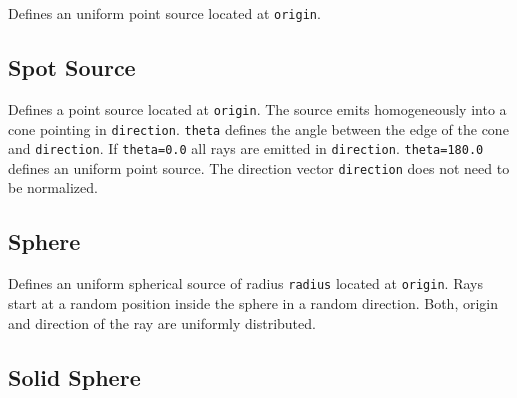 \documentclass[10pt,a4paper,titlepage]{article}
\begin{document}


\vspace{0.25cm}
Defines an uniform point source located at {\tt origin}. 


\subsection{Spot Source}








\vspace{0.25cm}
Defines a point source located at {\tt origin}. The source emits homogeneously into a cone pointing in {\tt direction}. {\tt theta} defines the angle between the edge of the cone and {\tt direction}. If {\tt theta=0.0} all rays are emitted in {\tt direction}. {\tt theta=180.0} defines an uniform point source. The direction vector {\tt direction} does not need to be normalized.

\subsection{Sphere}







\vspace{0.25cm}
Defines an uniform spherical source of radius {\tt radius} located at {\tt origin}. Rays start at a random position inside the sphere in a random direction. Both, origin and direction of the ray are uniformly distributed.

\subsection{Solid Sphere}
\end{document}
